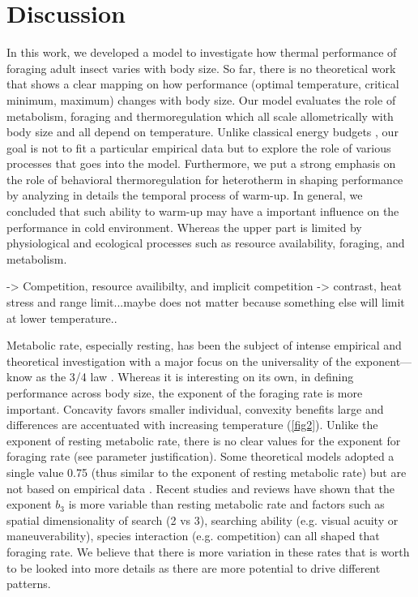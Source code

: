 \section*{Discussion}
In this work, we developed a model to investigate how thermal performance of foraging adult insect varies with body size.
So far, there is no theoretical work that shows a clear mapping on how performance (optimal temperature, critical minimum, maximum) changes with body size. 
Our model evaluates the role of metabolism, foraging and thermoregulation which all scale allometrically with body size and all depend on temperature.
Unlike classical energy budgets \citep[e.g.,][]{Kooijman2009}, our goal is not to fit a particular empirical data but to explore the role of various processes that goes into the model.
Furthermore, we put a strong emphasis on the role of behavioral thermoregulation for heterotherm in shaping performance by analyzing in details the temporal process of warm-up.
In general, we concluded that such ability to warm-up may have a important influence on the performance in cold environment.
Whereas the upper part is limited by physiological and ecological processes such as resource availability, foraging, and metabolism.

-> Competition, resource availibilty, and implicit competition
-> contrast, heat stress and range limit...maybe does not matter because something else will limit at lower temperature..

Metabolic rate, especially resting, has been the subject of intense empirical and theoretical investigation with a major focus on  the universality of the exponent---know as the 3/4 law \citep{Peters1986,West1997, Kozlowski1997, Brown2004, Isaac2010}. 
Whereas it is interesting on its own, in defining performance across body size, the exponent of the foraging rate is more important.
Concavity favors smaller individual, convexity benefits large and differences are accentuated with increasing temperature (\cref{fig2}).
Unlike the exponent of resting metabolic rate, there is no clear values for the exponent for foraging rate (see parameter justification).
Some theoretical models adopted a single value 0.75 (thus similar to the exponent of resting metabolic rate) but are not based on empirical data \citep{Yodzis1992, Brown1993}.
Recent studies and reviews have shown that the exponent $b_3$  is more variable than resting metabolic rate and factors such as spatial dimensionality of search (2 vs 3), searching ability (e.g. visual acuity or maneuverability),  species interaction (e.g. competition) can all shaped that foraging rate\citep{Pawar2012, Kalinkat2015}.
We believe that there is more variation in these rates that is worth to be looked into more details as there are more potential to drive different patterns.

